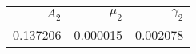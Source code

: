 \begin{tabular}{rrr}
\toprule
    $A_2$ &   $\mu_2$ &  $\gamma_2$ \\
 0.137206 &  0.000015 &    0.002078 \\
\bottomrule
\end{tabular}
